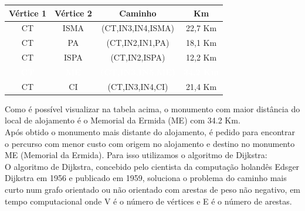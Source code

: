 \documentclass[12pt]{article}
\begin{document}
    
        \begin{table}[hbt!]
            \centering
            \begin{tabular}{*{4}{|c}|}
            \hline
            \textbf{Vértice 1} & \textbf{Vértice 2} & \textbf{Caminho} & \textbf{Km}\\ \hline
            CT                & ISMA     & (CT,IN3,IN4,ISMA)          & 22,7 Km     \\ \hline
            CT                 & PA      & (CT,IN2,IN1,PA)          & 18,1 Km     \\ \hline
            CT                 & ISPA    & (CT,IN2,ISPA)           & 12,2 Km     \\ \hline
             \textcolor{white}{\textbf{CT}}                 & \textcolor{white}{\textbf{ME}}      & \textcolor{white}{\textbf{(CT,IN3,IN5,ME)}}          & \textcolor{white}{\textbf{34.2 Km}}     \\ \hline
            CT               & CI        & (CT,IN3,IN4,CI)         & 21,4 Km     \\ \hline
        
            \end{tabular}
        \end{table}
        \noindent Como é possível visualizar na tabela acima, o monumento com maior distância do local de alojamento é o Memorial da Ermida (ME) com 34.2 Km.\\
        
        \noindent Após obtido o monumento mais distante do alojamento, é pedido para encontrar o percurso com menor custo com origem no alojamento e destino no monumento ME (Memorial da Ermida). Para isso utilizamos o algoritmo de Dijkstra:\\
        
        \noindent O algoritmo de Dijkstra, concebido pelo cientista da computação holandês Edsger Dijkstra em 1956 e publicado em 1959, soluciona o problema do caminho mais curto num grafo orientado ou não orientado com arestas de peso não negativo, em tempo computacional onde V é o número de vértices e E é o número de arestas.\\
        
\end{document}
